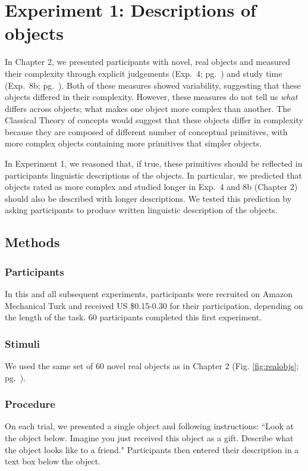 \section{Experiment 1: Descriptions of objects}
In Chapter 2, we presented participants with novel, real objects and measured their complexity through explicit judgements (Exp.\ 4; pg.\ \pageref{ch2-4}) and study time (Exp.\ 8b; pg.\ \pageref{ch2-8b}). Both of these measures showed variability, suggesting that these objects differed in their complexity. However, these measures do not tell us {\it what} differs across objects; what makes one object more complex than another. The Classical Theory of concepts would suggest that these objects differ in complexity because they are composed of different number of conceptual primitives, with more complex objects containing more primitives that simpler objects. 

In Experiment 1, we reasoned that, if true, these primitives should be reflected in participants linguistic descriptions of the objects. In particular, we predicted that objects rated as more complex and studied longer in Exp.\ 4 and 8b (Chapter 2) should also be described with longer descriptions. We tested this prediction by asking participants to produce written linguistic description of the objects.



\subsection{Methods}
\subsubsection{Participants} 
In this and all subsequent experiments, participants were recruited on Amazon Mechanical Turk and received US \$0.15-0.30 for their participation, depending on the length of the task. 60 participants completed this first experiment.
\subsubsection{Stimuli} 
We used the same set of 60 novel real objects as in Chapter 2 (Fig. \ref{fig:realobjs}; pg.\ \pageref{fig:realobjs}).

\subsubsection{Procedure}
On each trial, we presented a single object and following instructions:  ``Look at the object below. Imagine you just received this object as a gift. Describe what the object looks like to a friend." Participants then entered their description in a text box below the object.

